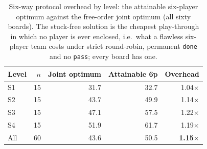 \begin{table}[tbp]
  \centering
  \footnotesize
  \caption{Six-way protocol overhead by level: the attainable six-player optimum against the free-order joint optimum (all sixty boards). The stuck-free solution is the cheapest play-through in which no player is ever enclosed, i.e.\ what a flawless six-player team costs under strict round-robin, permanent \texttt{done} and no \texttt{pass}; every board has one.}
  \label{tab:overhead}
  \begin{tabular}{lrrrr}
    \toprule
    Level & $n$ & Joint optimum & Attainable 6p & Overhead \\
    \midrule
    S1 & 15 & 31.7 & 32.7 & 1.04$\times$ \\
    S2 & 15 & 43.7 & 49.9 & 1.14$\times$ \\
    S3 & 15 & 47.1 & 57.5 & 1.22$\times$ \\
    S4 & 15 & 51.9 & 61.7 & 1.19$\times$ \\
    \midrule All & 60 & 43.6 & 50.5 & \textbf{1.15$\times$} \\
    \bottomrule
  \end{tabular}
\end{table}


